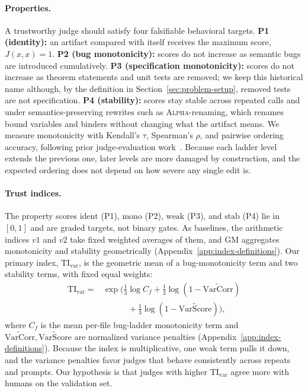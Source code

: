 \paragraph{Properties.}
A trustworthy judge should satisfy four falsifiable behavioral targets.
\textbf{P1 (identity):} an artifact compared with itself receives the maximum score, \(J(x,x)=1\).
\textbf{P2 (bug monotonicity):} scores do not increase as semantic bugs are introduced cumulatively.
\textbf{P3 (specification monotonicity):} scores do not increase as theorem statements and unit tests are removed; we keep this historical name although, by the definition in Section~\ref{sec:problem-setup}, removed tests are not specification.
\textbf{P4 (stability):} scores stay stable across repeated calls and under semantics-preserving rewrites such as \textsc{Alpha}-renaming, which renames bound variables and binders without changing what the artifact means.
We measure monotonicity with Kendall's $\tau$, Spearman's $\rho$, and pairwise ordering accuracy, following prior judge-evaluation work~\citep{TongZhang2024CodeJudge,Zhuo2024ICEScore}.
Because each ladder level extends the previous one, later levels are more damaged by construction, and the expected ordering does not depend on how severe any single edit is.

\paragraph{Trust indices.}
The property scores \(\text{ident}\) (P1), \(\text{mono}\) (P2), \(\text{weak}\) (P3), and \(\text{stab}\) (P4) lie in $[0,1]$ and are graded targets, not binary gates.
As baselines, the arithmetic indices \(v1\) and \(v2\) take fixed weighted averages of them, and GM aggregates monotonicity and stability geometrically (Appendix~\ref{app:index-definitions}).
Our primary index, \(\mathrm{TI}_{\mathrm{var}}\), is the geometric mean of a bug-monotonicity term and two stability terms, with fixed equal weights:
\[
  \begin{aligned}
    \mathrm{TI}_{\mathrm{var}}
    ={} & \exp\!\Big(
    \tfrac{1}{3}\log C_f
    + \tfrac{1}{3}\log(1-\widetilde{\mathrm{VarCorr}}) \\
        & \qquad\quad
    + \tfrac{1}{3}\log(1-\widetilde{\mathrm{VarScore}})
    \Big),
  \end{aligned}
\]
where \(C_f\) is the mean per-file bug-ladder monotonicity term and \(\widetilde{\mathrm{VarCorr}},\widetilde{\mathrm{VarScore}}\) are normalized variance penalties (Appendix~\ref{app:index-definitions}).
Because the index is multiplicative, one weak term pulls it down, and the variance penalties favor judges that behave consistently across repeats and prompts.
Our hypothesis is that judges with higher \(\mathrm{TI}_{\mathrm{var}}\) agree more with humans on the validation set.

